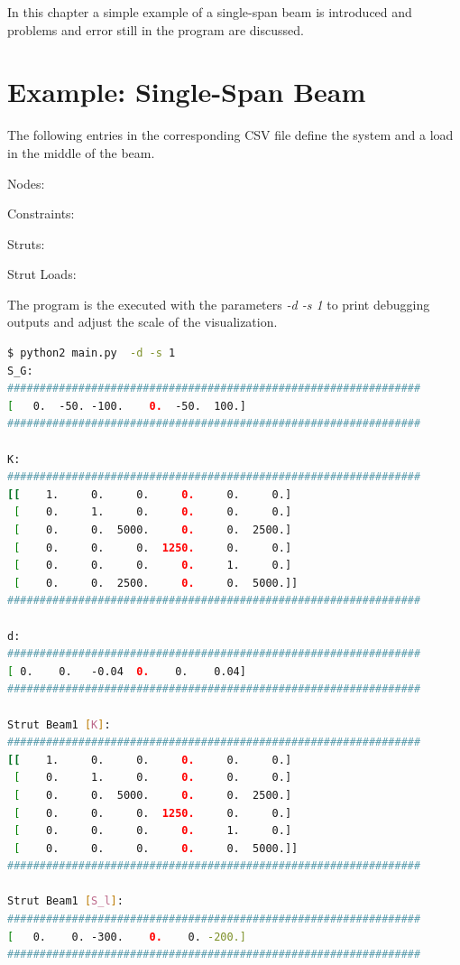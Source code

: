 In this chapter a simple example of a single-span beam is introduced and problems and error still in the program are discussed.

\section{Example: Single-Span Beam}
\label{sec:example1}

The following entries in the corresponding CSV file define the system and a load in the middle of the beam. 

Nodes:


Constraints:


Struts:


Strut Loads:


The program is the executed with the parameters \textit{-d -s 1} to print debugging outputs and adjust the scale of the visualization.

\begin{inconsolata}
\begin{minipage}{\linewidth}
\begin{lstlisting}[language=bash]
$ python2 main.py  -d -s 1  
S_G: 
################################################################
[   0.  -50. -100.    0.  -50.  100.]
################################################################

K: 
################################################################
[[    1.     0.     0.     0.     0.     0.]
 [    0.     1.     0.     0.     0.     0.]
 [    0.     0.  5000.     0.     0.  2500.]
 [    0.     0.     0.  1250.     0.     0.]
 [    0.     0.     0.     0.     1.     0.]
 [    0.     0.  2500.     0.     0.  5000.]]
################################################################

d: 
################################################################
[ 0.    0.   -0.04  0.    0.    0.04]
################################################################

Strut Beam1 [K]: 
################################################################
[[    1.     0.     0.     0.     0.     0.]
 [    0.     1.     0.     0.     0.     0.]
 [    0.     0.  5000.     0.     0.  2500.]
 [    0.     0.     0.  1250.     0.     0.]
 [    0.     0.     0.     0.     1.     0.]
 [    0.     0.     0.     0.     0.  5000.]]
################################################################

Strut Beam1 [S_l]: 
################################################################
[   0.    0. -300.    0.    0. -200.]
################################################################

\end{lstlisting}
\end{minipage}
\end{inconsolata}

